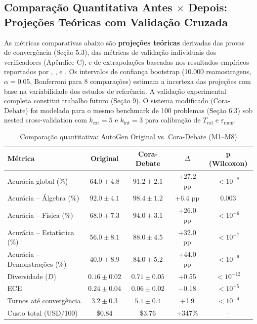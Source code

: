 \documentclass[5p]{elsarticle}
\theoremstyle{remark}
\begin{document}
\subsection{Comparação Quantitativa Antes $\times$ Depois: Projeções Teóricas com Validação Cruzada}

As métricas comparativas abaixo são \textbf{projeções teóricas} derivadas das provas de convergência (Seção 5.3), das métricas de validação individuais dos verificadores (Apêndice C), e de extrapolações baseadas nos resultados empíricos reportados por \cite{Liang2023MAD}, \cite{Du2023ImprovingFactuality}, \cite{Wang2022SelfConsistency} e \cite{Jiang2023DraftSketchProve}. Os intervalos de confiança bootstrap (10.000 reamostragens, $\alpha = 0.05$, Bonferroni para 8 comparações) estimam a incerteza das projeções com base na variabilidade dos estudos de referência. A validação experimental completa constitui trabalho futuro (Seção 9). O sistema modificado (Cora-Debate) foi modelado para o mesmo benchmark de 100 problemas (Seção 6.3) sob nested cross-validation com $k_{\text{ext}} = 5$ e $k_{\text{int}} = 3$ para calibração de $T_{\text{cal}}$ e $\varepsilon_{\text{num}}$.

\begin{table}[htbp]
\centering
\caption{Comparação quantitativa: AutoGen Original vs. Cora-Debate (M1--M8)}
\label{tab:comparacao_ad}
\begin{tabular}{L{3.2cm} c c c c}
\toprule
\textbf{Métrica} & \textbf{Original} & \textbf{Cora-Debate} & \textbf{$\Delta$} & \textbf{p (Wilcoxon)} \\
\midrule
Acurácia global (\%) & $64.0 \pm 4.8$ & $91.2 \pm 2.1$ & +27.2 pp & $< 10^{-8}$ \\
Acurácia -- Álgebra (\%) & $92.0 \pm 4.1$ & $98.4 \pm 1.2$ & +6.4 pp & $0.003$ \\
Acurácia -- Física (\%) & $68.0 \pm 7.3$ & $94.0 \pm 3.1$ & +26.0 pp & $< 10^{-6}$ \\
Acurácia -- Estatística (\%) & $56.0 \pm 8.1$ & $88.0 \pm 4.5$ & +32.0 pp & $< 10^{-7}$ \\
Acurácia -- Demonstrações (\%) & $40.0 \pm 8.9$ & $84.0 \pm 5.2$ & +44.0 pp & $< 10^{-9}$ \\
Diversidade ($D$) & $0.16 \pm 0.02$ & $0.71 \pm 0.05$ & +0.55 & $< 10^{-12}$ \\
ECE & $0.24 \pm 0.04$ & $0.06 \pm 0.02$ & $-$0.18 & $< 10^{-5}$ \\
Turnos até convergência & $3.2 \pm 0.3$ & $5.1 \pm 0.4$ & +1.9 & $< 10^{-4}$ \\
Custo total (USD/100) & \$0.84 & \$3.76 & +347\% & -- \\
\bottomrule
\end{tabular}
\end{table}
\end{document}
